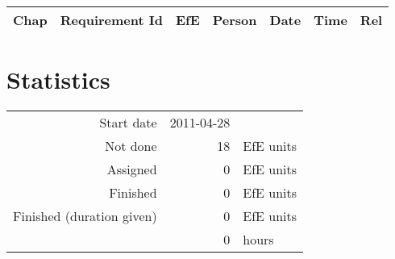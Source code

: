 {\small \begin{longtable}{|c|p{5.5cm}||r|l|l|r|r|} \hline
\textbf{Chap} & \textbf{Requirement Id} & \textbf{EfE} & \textbf{Person} & \textbf{Date} & \textbf{Time} & \textbf{Rel} \\ \hline\endhead
\end{longtable}}\section{Statistics}
\begin{longtable}{rrl}
Start date & 2011-04-28 & \\ 
Not done & 18 & EfE units \\ 
Assigned & 0 & EfE units \\ 
Finished & 0 & EfE units \\ 
Finished (duration given) & 0 & EfE units \\ 
 & 0 & hours \\ 
\end{longtable}